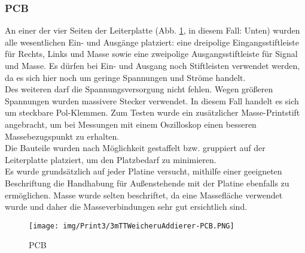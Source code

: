 \newpage
\subsubsection{PCB}\label{subsec:5.5.3}
An einer der vier Seiten der Leiterplatte (Abb. \ref{fig:5.5.3.1}, in diesem Fall: Unten) wurden alle wesentlichen Ein- und Ausgänge platziert: eine dreipolige Eingangsstiftleiste für Rechts, Links und Masse sowie eine zweipolige Ausgangsstiftleiste für Signal und Masse.
Es dürfen bei Ein- und Ausgang noch Stiftleisten verwendet werden, da es sich hier noch um geringe Spannungen und Ströme handelt.\\
Des weiteren darf die Spannungsversorgung nicht fehlen.
Wegen größeren Spannungen wurden massivere Stecker verwendet.
In diesem Fall handelt es sich um steckbare Pol-Klemmen.
Zum Testen wurde ein zusätzlicher Masse-Printstift angebracht, um bei Messungen mit einem Oszilloskop einen besseren Massebezugspunkt zu erhalten.\\
Die Bauteile wurden nach Möglichkeit gestaffelt bzw. gruppiert auf der Leiterplatte platziert, um den Platzbedarf zu minimieren.\\
Es wurde grundsätzlich auf jeder Platine versucht, mithilfe einer geeigneten Beschriftung die Handhabung für Außenstehende mit der Platine ebenfalls zu ermöglichen. Masse wurde selten beschriftet, da eine Massefläche verwendet wurde und daher die Masseverbindungen sehr gut ersichtlich sind.
\begin{figure} [H]
	\centering
	\texttt{[image: img/Print3/3mTTWeicheruAddierer-PCB.PNG]}
	\caption{PCB}
	\label {fig:5.5.3.1}
\end{figure}














